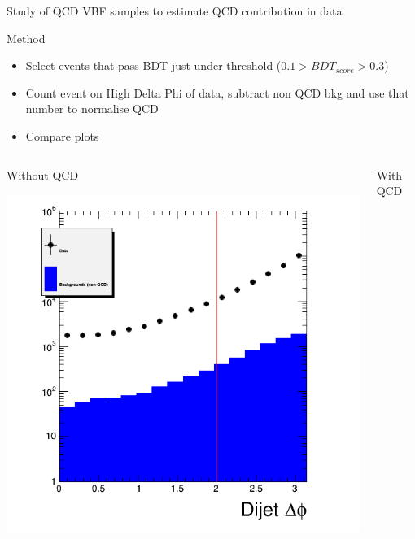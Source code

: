 \documentclass[8pt]{beamer}
\begin{document}
\begin{frame}{Study of QCD VBF samples to estimate QCD contribution in data}
 
\begin{block}{Method}

\begin{itemize}
  \item Select events that pass BDT just under threshold ($0.1 > BDT_{score} > 0.3$)
  \item Count event on High Delta Phi of data, subtract non QCD bkg and use that number to normalise QCD
  \item Compare plots
\end{itemize}

\end{block}

\begin{columns}
 
\begin{block}{Without QCD}
 
\includegraphics[width=\linewidth]{img/ctrl_dphi.png}
 
\end{block}

\begin{block}{With QCD}
 

\end{block}
\end{columns}
\end{frame}
\end{document}
